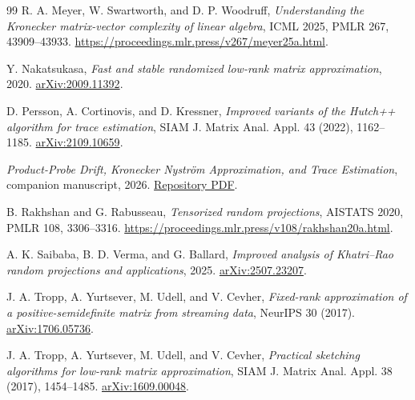 \documentclass[11pt,a4paper]{article}
\theoremstyle{definition}
\theoremstyle{remark}
\numberwithin{equation}{section}
\begin{document}
\begin{thebibliography}{99}
R. A. Meyer, W. Swartworth, and D. P. Woodruff,
\emph{Understanding the Kronecker matrix-vector complexity of linear algebra},
ICML 2025, PMLR 267, 43909--43933.
\url{https://proceedings.mlr.press/v267/meyer25a.html}.

Y. Nakatsukasa,
\emph{Fast and stable randomized low-rank matrix approximation}, 2020.
\href{https://arxiv.org/abs/2009.11392}{arXiv:2009.11392}.

D. Persson, A. Cortinovis, and D. Kressner,
\emph{Improved variants of the Hutch++ algorithm for trace estimation},
SIAM J. Matrix Anal. Appl. 43 (2022), 1162--1185. \href{https://arxiv.org/abs/2109.10659}{arXiv:2109.10659}.

\emph{Product-Probe Drift, Kronecker Nystr\"om Approximation, and Trace
Estimation}, companion manuscript, 2026.
\href{https://github.com/DiarHaidary/Results/blob/main/manuscripts/02-Product-Probe-Drift/Product_Probe_Drift_v2.pdf}{Repository PDF}.

B. Rakhshan and G. Rabusseau,
\emph{Tensorized random projections}, AISTATS 2020, PMLR 108, 3306--3316.
\url{https://proceedings.mlr.press/v108/rakhshan20a.html}.

A. K. Saibaba, B. D. Verma, and G. Ballard,
\emph{Improved analysis of Khatri--Rao random projections and applications},
2025. \href{https://arxiv.org/abs/2507.23207}{arXiv:2507.23207}.

J. A. Tropp, A. Yurtsever, M. Udell, and V. Cevher,
\emph{Fixed-rank approximation of a positive-semidefinite matrix from
streaming data}, NeurIPS 30 (2017). \href{https://arxiv.org/abs/1706.05736}{arXiv:1706.05736}.

J. A. Tropp, A. Yurtsever, M. Udell, and V. Cevher,
\emph{Practical sketching algorithms for low-rank matrix approximation},
SIAM J. Matrix Anal. Appl. 38 (2017), 1454--1485. \href{https://arxiv.org/abs/1609.00048}{arXiv:1609.00048}.

\end{thebibliography}
\endgroup
\end{document}
